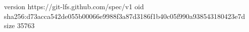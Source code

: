 version https://git-lfs.github.com/spec/v1
oid sha256:d73acca542de055b00066e9988f3a87d3186f1b40c05f990a938543180423e7d
size 35763
